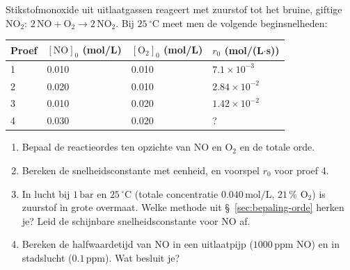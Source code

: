 \begin{oefening}
Stikstofmonoxide uit uitlaatgassen reageert met zuurstof tot het bruine, giftige \(\mathrm{NO_2}\): \(\mathrm{2\,NO + O_2 \rightarrow 2\,NO_2}\). Bij \(25\,^\circ\mathrm{C}\) meet men de volgende beginsnelheden:

\begin{center}
\begin{tabular}{llll}
\toprule
Proef & \([\mathrm{NO}]_0\) (mol/L) & \([\mathrm{O_2}]_0\) (mol/L) & \(r_0\) (mol/(L\ensuremath{\cdot{}}s)) \\
\midrule
1 & 0.010 & 0.010 & \(7.1\times10^{-3}\) \\
2 & 0.020 & 0.010 & \(2.84\times10^{-2}\) \\
3 & 0.010 & 0.020 & \(1.42\times10^{-2}\) \\
4 & 0.030 & 0.020 & ? \\
\bottomrule
\end{tabular}
\end{center}

\begin{enumerate}
\item[(a)]
  Bepaal de reactieordes ten opzichte van \(\mathrm{NO}\) en \(\mathrm{O_2}\) en de totale orde.
\item[(b)]
  Bereken de snelheidsconstante met eenheid, en voorspel \(r_0\) voor proef 4.
\item[(c)]
  In lucht bij \(1\,\mathrm{bar}\) en \(25\,^\circ\mathrm{C}\) (totale concentratie \(0.040\,\mathrm{mol/L}\), \(21\,\%\) \(\mathrm{O_2}\)) is zuurstof in grote overmaat. Welke methode uit \S~\ref{sec:bepaling-orde} herken je? Leid de schijnbare snelheidsconstante voor \(\mathrm{NO}\) af.
\item[(d)]
  Bereken de halfwaardetijd van \(\mathrm{NO}\) in een uitlaatpijp (\(1000\,\mathrm{ppm}\) NO) en in stadslucht (\(0.1\,\mathrm{ppm}\)). Wat besluit je?
\end{enumerate}
\end{oefening}

